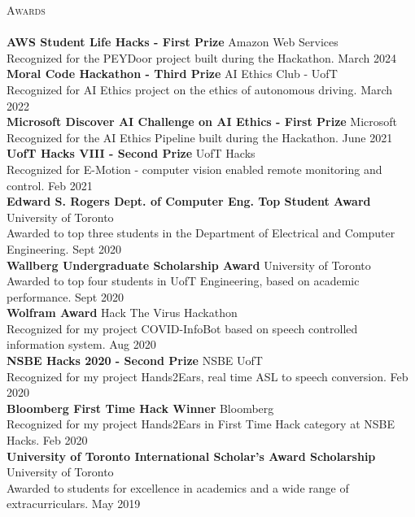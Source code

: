 \documentclass[a4paper]{article}
\newcommand{\lineunder} {
    \vspace*{-8pt} \\
    \hspace*{-18pt} \hrulefill \\
}
\newcommand{\header} [1] {
    {\hspace*{-18pt}\vspace*{6pt} \textsc{#1}}
    \vspace*{-6pt} \lineunder
}
\begin{document}
\header{Awards}
\textbf{AWS Student Life Hacks - First Prize} \hfill Amazon Web Services\\
Recognized for the PEYDoor project built during the Hackathon. \hfill March 2024\\
\vspace*{2mm}
\textbf{Moral Code Hackathon - Third Prize} \hfill AI Ethics Club - UofT\\
Recognized for AI Ethics project on the ethics of autonomous driving. \hfill March 2022\\
\vspace*{2mm}
\textbf{Microsoft Discover AI Challenge on AI Ethics - First Prize} \hfill Microsoft\\
Recognized for the AI Ethics Pipeline built during the Hackathon. \hfill June 2021\\
\vspace*{2mm}
\textbf{UofT Hacks VIII - Second Prize} \hfill UofT Hacks\\
Recognized for E-Motion - computer vision enabled remote monitoring and
control. \hfill Feb 2021\\
\vspace*{2mm}
\textbf{Edward S. Rogers Dept. of Computer Eng. Top Student Award} \hfill University of Toronto\\
Awarded to top three students in the Department of Electrical and Computer
Engineering. \hfill Sept 2020\\
\vspace*{2mm}
\textbf{Wallberg Undergraduate Scholarship Award} \hfill University of Toronto\\
Awarded to top four students in UofT Engineering, based on academic
performance. \hfill Sept 2020\\
\vspace*{2mm}
\textbf{Wolfram Award} \hfill Hack The Virus Hackathon\\
Recognized for my project COVID-InfoBot based on speech controlled information system. \hfill Aug 2020\\
\vspace*{2mm}
\textbf{NSBE Hacks 2020 - Second Prize} \hfill NSBE UofT\\
Recognized for my project Hands2Ears, real time ASL to speech conversion. \hfill Feb 2020\\
\vspace*{2mm}
\textbf{Bloomberg First Time Hack Winner} \hfill Bloomberg\\
Recognized for my project Hands2Ears in \textquotedbl{}First Time Hack\textquotedbl{} category at NSBE Hacks. \hfill Feb 2020\\
\vspace*{2mm}
\textbf{University of Toronto International Scholar’s Award Scholarship} \hfill University of Toronto\\
Awarded to students for excellence in academics and a wide range of extracurriculars. \hfill May 2019\\
\end{document}
